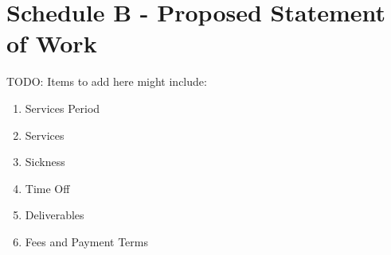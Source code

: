 \documentclass[nz-terms]{subfiles}
\begin{document}
\section{Schedule B - Proposed Statement of Work}

TODO: Items to add here might include:

\begin{enumerate}
\item Services Period
\item Services
\item Sickness
\item Time Off
\item Deliverables
\item Fees and Payment Terms
\end{enumerate}
\end{document}
